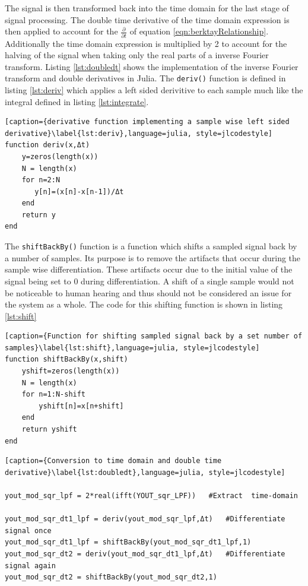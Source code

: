 The signal is then transformed back into the time domain for the last stage of signal processing. The double time derivative of the time domain expression is then applied to account for the $\frac{\partial}{\partial t}$ of equation \ref{eqn:berktayRelationship}. Additionally the time domain expression is multiplied by 2 to account for the halving of the signal when taking only the real parts of a inverse Fourier transform. Listing \ref{lst:doubledt} shows the implementation of the inverse Fourier transform and double derivatives in Julia. The \texttt{deriv()} function is defined in listing \ref{lst:deriv} which applies a left sided derivitive to each sample much like the integral defined in listing \ref{lst:integrate}.

\begin{lstlisting}[caption={derivative function implementing a sample wise left sided derivative}\label{lst:deriv},language=julia, style=jlcodestyle]
function deriv(x,Δt)
    y=zeros(length(x))
    N = length(x)
    for n=2:N
       y[n]=(x[n]-x[n-1])/Δt
    end
    return y
end
\end{lstlisting}

The \texttt{shiftBackBy()} function is a function which shifts a sampled signal back by a number of samples. Its purpose is to remove the artifacts that occur during the sample wise differentiation. These artifacts occur due to the initial value of the signal being set to 0 during differentiation. A shift of a single sample would not be noticeable to human hearing and thus should not be considered an issue for the system as a whole. The code for this shifting function is shown in listing \ref{lst:shift}
\begin{lstlisting}[caption={Function for shifting sampled signal back by a set number of samples}\label{lst:shift},language=julia, style=jlcodestyle]
function shiftBackBy(x,shift)
    yshift=zeros(length(x))
    N = length(x)
    for n=1:N-shift
        yshift[n]=x[n+shift]
    end
    return yshift
end
\end{lstlisting}

\begin{lstlisting}[caption={Conversion to time domain and double time derivative}\label{lst:doubledt},language=julia, style=jlcodestyle]

yout_mod_sqr_lpf = 2*real(ifft(YOUT_sqr_LPF))   #Extract  time-domain

yout_mod_sqr_dt1_lpf = deriv(yout_mod_sqr_lpf,Δt)   #Differentiate signal once
yout_mod_sqr_dt1_lpf = shiftBackBy(yout_mod_sqr_dt1_lpf,1)
yout_mod_sqr_dt2 = deriv(yout_mod_sqr_dt1_lpf,Δt)   #Differentiate signal again
yout_mod_sqr_dt2 = shiftBackBy(yout_mod_sqr_dt2,1)
\end{lstlisting}

